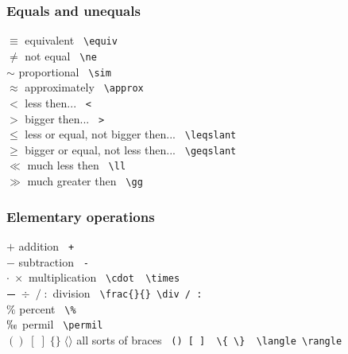 \subsubsection{Equals and unequals}
\begin{tabbing}
\mySymbols
$ {\equiv}$           \> equivalent                        \> \verb` \equiv ` \\
$ {\ne}$              \> not equal                         \> \verb` \ne ` \\ 
$ {\sim}$             \> proportional                      \> \verb` \sim ` \\
$ {\approx}$          \> approximately                     \> \verb` \approx ` \\
$ {<}$                \> less then...                      \> \verb` < ` \\
$ {>}$                \> bigger then...                    \> \verb` > ` \\ 
$ {\leqslant}$        \> less or equal, not bigger then... \> \verb` \leqslant ` \\
$ {\geqslant}$        \> bigger or equal, not less then... \> \verb` \geqslant ` \\
$ {\ll}$              \> much less then                    \> \verb` \ll ` \\
$ {\gg}$              \> much greater then                 \> \verb` \gg ` \\
\end{tabbing}

\subsubsection{Elementary operations}
\begin{tabbing}
\mySymbols
$ +$                  \> addition                                \> \verb` + `       \\
$ -$                  \> subtraction                             \> \verb` - `       \\
$ \cdot \; \times$    \> multiplication                          \> \verb` \cdot  \times `      \\
$ \frac{\quad}{\quad}\; \div\;/ \; :$\> division                 \> \verb` \frac{}{} \div / : ` \\
$ \%$                 \> percent                                 \> \verb` \% `      \\
$ \permil$            \> permil                                  \> \verb` \permil ` \\
$ ()\; [ \;] \; \{ \} \; \langle \rangle$ \> all sorts of braces \> \verb` () [ ]  \{ \}  \langle \rangle ` \\
\end{tabbing}

